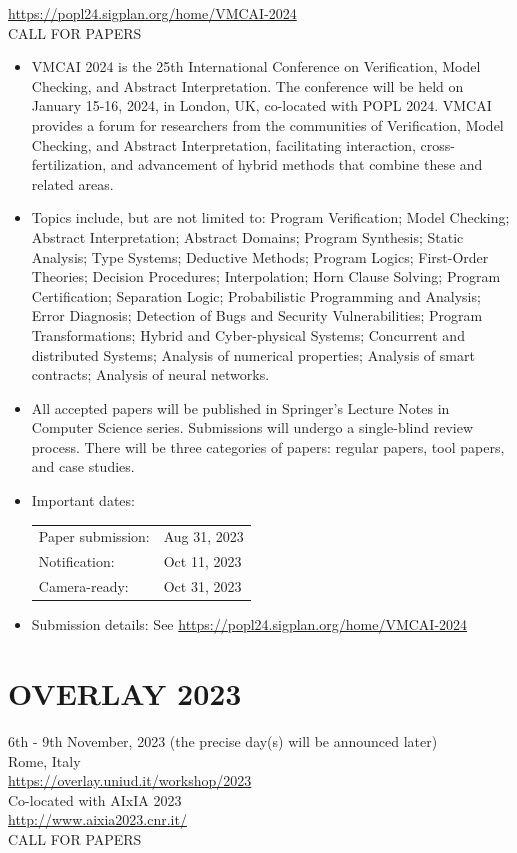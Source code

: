 \documentclass[prodmode,acmtecs]{acmsmall} %
\begin{document}
  \href{https://popl24.sigplan.org/home/VMCAI-2024}{https://popl24.sigplan.org/home/VMCAI-2024}\\ 
CALL FOR PAPERS 

\begin{itemize}\item  VMCAI 2024 is the 25th International Conference on Verification, Model Checking, and Abstract Interpretation. The conference will be held on January 15-16, 2024, in London, UK, co-located with POPL 2024. VMCAI provides a forum for researchers from the communities of Verification, Model Checking, and Abstract Interpretation, facilitating interaction, cross-fertilization, and advancement of hybrid methods that combine these and related areas. 
 
\item  Topics include, but are not limited to: Program Verification; Model Checking; Abstract Interpretation; Abstract Domains; Program Synthesis; Static Analysis; Type Systems; Deductive Methods; Program Logics; First-Order Theories; Decision Procedures; Interpolation; Horn Clause Solving; Program Certification; Separation Logic; Probabilistic Programming and Analysis; Error Diagnosis; Detection of Bugs and Security Vulnerabilities; Program Transformations; Hybrid and Cyber-physical Systems; Concurrent and distributed Systems; Analysis of numerical properties; Analysis of smart contracts; Analysis of neural networks. 
 
\item  All accepted papers will be published in Springer’s Lecture Notes in Computer Science series. Submissions will undergo a single-blind review process. There will be three categories of papers: regular papers, tool papers, and case studies.  
 
\item  Important dates:   
 
\begin{tabulary}{\linewidth}{LL}Paper submission:  & Aug 31, 2023 \\
Notification:  & Oct 11, 2023 \\
Camera-ready:  & Oct 31, 2023 \\
\end{tabulary}
 
\item  Submission details: See \href{https://popl24.sigplan.org/home/VMCAI-2024}{https://popl24.sigplan.org/home/VMCAI-2024} 
 
\end{itemize}\section{OVERLAY 2023}\label{OVERLAY2023}  6th - 9th November, 2023 (the precise day(s) will be announced later)\\ 
  Rome, Italy\\ 
  \href{https://overlay.uniud.it/workshop/2023}{https://overlay.uniud.it/workshop/2023}\\ 
  Co-located with AIxIA 2023\\ 
  \href{http://www.aixia2023.cnr.it/}{http://www.aixia2023.cnr.it/}\\ 
CALL FOR PAPERS 
\end{document}

